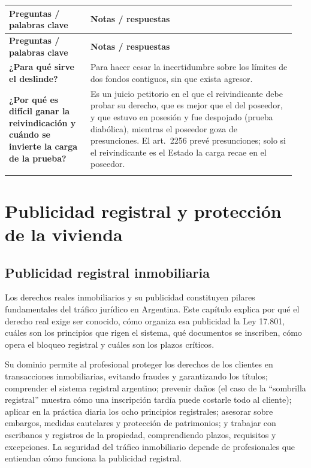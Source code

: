 \documentclass[12pt,oneside]{book}
\makeatletter
\newenvironment{cornell}{%
    \par\vspace{0.5em}
    \noindent
    \begin{longtable}{@{}>{\raggedright\arraybackslash}p{0.27\linewidth}
                         >{\raggedright\arraybackslash}p{0.68\linewidth}@{}}
    \toprule
    \textbf{Preguntas / palabras clave} & \textbf{Notas / respuestas} \\
    \midrule
    \endfirsthead
    \toprule
    \textbf{Preguntas / palabras clave} & \textbf{Notas / respuestas} \\
    \midrule
    \endhead
}{%
    \bottomrule
    \end{longtable}
}
\newcommand{\cornellsummary}[1]{%
    \midrule
    \multicolumn{2}{@{}p{\dimexpr0.95\linewidth+2\tabcolsep\relax}@{}}{%
        \vspace{0.2em}\textbf{Resumen:} #1\vspace{0.2em}} \\
}
\makeatother
\begin{document}
\begin{cornell}
\textbf{¿Para qué sirve el deslinde?} &
Para hacer cesar la incertidumbre sobre los límites de dos fondos contiguos, sin que exista agresor. \\

\textbf{¿Por qué es difícil ganar la reivindicación y cuándo se invierte la carga de la prueba?} &
Es un juicio petitorio en el que el reivindicante debe probar su derecho, que es mejor que el del poseedor, y que estuvo en posesión y fue despojado (prueba diabólica), mientras el poseedor goza de presunciones. El art.~2256 prevé presunciones; solo si el reivindicante es el Estado la carga recae en el poseedor. \\

\cornellsummary{Las acciones reales defienden el derecho real mismo. La reivindicatoria protege la existencia del derecho ante el despojo total; la negatoria, la libertad ante la turbación; la confesoria, de carácter residual, la plenitud ante el impedimento; el deslinde resuelve la incertidumbre sobre límites. En todas la legitimación activa corresponde al titular del derecho real y, en supuestos específicos, al acreedor hipotecario. La reivindicación de inmuebles es un juicio petitorio de gran dificultad probatoria.}
\end{cornell}

\part{Publicidad registral y protección de la vivienda}

\chapter{Publicidad registral inmobiliaria}\label{cap:registral}

Los derechos reales inmobiliarios y su publicidad constituyen pilares fundamentales del tráfico jurídico en Argentina. Este capítulo explica por qué el derecho real exige ser conocido, cómo organiza esa publicidad la Ley 17.801, cuáles son los principios que rigen el sistema, qué documentos se inscriben, cómo opera el bloqueo registral y cuáles son los plazos críticos.

Su dominio permite al profesional proteger los derechos de los clientes en transacciones inmobiliarias, evitando fraudes y garantizando los títulos; comprender el sistema registral argentino; prevenir daños (el caso de la ``sombrilla registral'' muestra cómo una inscripción tardía puede costarle todo al cliente); aplicar en la práctica diaria los ocho principios registrales; asesorar sobre embargos, medidas cautelares y protección de patrimonios; y trabajar con escribanos y registros de la propiedad, comprendiendo plazos, requisitos y excepciones. La seguridad del tráfico inmobiliario depende de profesionales que entiendan cómo funciona la publicidad registral.
\end{document}
